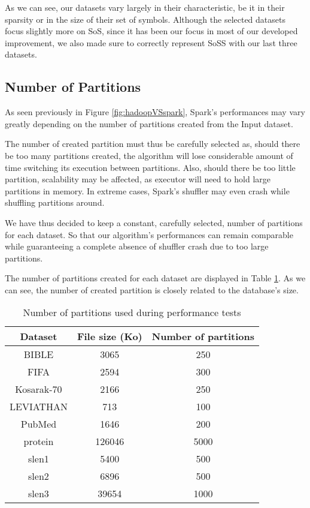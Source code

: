 \documentclass{eplmastersthesis}
\begin{document}
As we can see, our datasets vary largely in their characteristic, be it in their sparsity or in the size of their set of symbols. Although the selected datasets focus slightly more on \acrlong{SoS}, since it has been our focus in most of our developed improvement, we also made sure to correctly represent \acrlong{SoSS} with our last three datasets. \newline

\subsection{Number of Partitions}

As seen previously in Figure \ref{fig:hadoopVSspark}, Spark's performances may vary greatly depending on the number of partitions created from the Input dataset.\newline

The number of created partition must thus be carefully selected as, should there be too many partitions created, the algorithm will lose considerable amount of time switching its execution between partitions. Also, should there be too little partition, scalability may be affected, as executor will need to hold large partitions in memory. In extreme cases, Spark's shuffler may even crash while shuffling partitions around. \newline

We have thus decided to keep a constant, carefully selected, number of partitions for each dataset. So that our algorithm's performances can remain comparable while guaranteeing a complete absence of shuffler crash due to too large partitions.\newline

The number of partitions created for each dataset are displayed in Table \ref{tab:numPartitions}. As we can see, the number of created partition is closely related to the database's size.

\begin{table}[h]
  \centering
  \begin{tabular}{| c | c | c |}
  	\hline
  	Dataset & File size (Ko) & Number of partitions \\
  	\hline
  	BIBLE & 3065 & 250 \\
  	\hline
  	FIFA & 2594 &300\\
  	\hline
  	Kosarak-70 & 2166 & 250\\
  	\hline  
  	LEVIATHAN & 713 & 100\\
  	\hline
  	PubMed & 1646 & 200\\
  	\hline
  	protein & 126046 & 5000\\
  	\hline
  	slen1 & 5400 & 500\\
 	\hline 
  	slen2 & 6896 & 500\\
  	\hline
  	slen3 & 39654 & 1000\\
  	\hline
  \end{tabular}
  \caption{Number of partitions used during performance tests}
  \label{tab:numPartitions}
\end{table}
\end{document}
